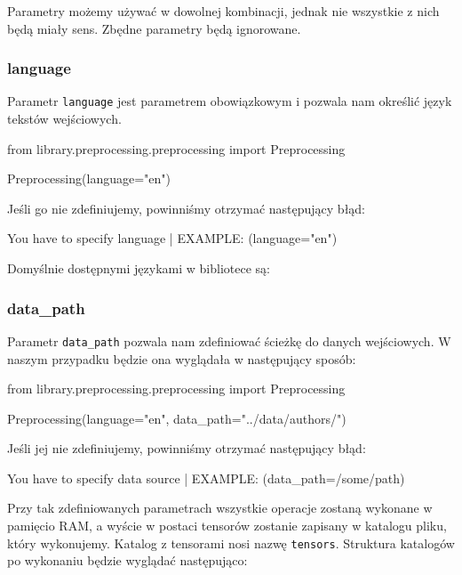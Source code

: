 Parametry możemy używać w dowolnej kombinacji, jednak nie wszystkie z nich będą miały sens. Zbędne
parametry będą ignorowane.

\subsubsection{language}
Parametr \texttt{language} jest parametrem obowiązkowym i pozwala nam określić język tekstów wejściowych.
\begin{python}
from library.preprocessing.preprocessing import Preprocessing

Preprocessing(language="en")

\end{python}

Jeśli go nie zdefiniujemy, powinniśmy otrzymać następujący błąd:

\begin{consolerror}
You have to specify language | EXAMPLE: (language="en")
\end{consolerror}

Domyślnie dostępnymi językami w bibliotece są:

\languages 

\subsubsection{data\_path}
Parametr \texttt{data\_path} pozwala nam zdefiniować ścieżkę do danych wejściowych. W naszym przypadku
będzie ona wyglądała w następujący sposób:
\begin{python}
from library.preprocessing.preprocessing import Preprocessing

Preprocessing(language="en",
              data_path="../data/authors/")
                   
\end{python}

Jeśli jej nie zdefiniujemy, powinniśmy otrzymać następujący błąd:

\begin{consolerror}
You have to specify data source | EXAMPLE: (data_path=/some/path)
\end{consolerror}

Przy tak zdefiniowanych parametrach wszystkie operacje zostaną wykonane w pamięcio RAM, a wyście w postaci
tensorów zostanie zapisany w katalogu pliku, który wykonujemy. Katalog z tensorami nosi nazwę \texttt{tensors}.
Struktura katalogów po wykonaniu będzie wyglądać następująco:

